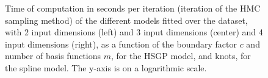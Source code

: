 \documentclass[onecolumn,a4paper,11pt]{article}
\begin{document}
\begin{figure}
\caption{Time of computation in seconds per iteration (iteration of the HMC sampling method) of the different models fitted over the dataset, with 2 input dimensions (left) and 3 input dimensions (center) and 4 input dimensions (right), as a function of the boundary factor $c$ and number of basis functions $m$, for the HSGP model, and knots, for the spline model. The y-axis is on a logarithmic scale.}
  \label{ch5_fig20_time2D_diabetes}
\end{figure}
\end{document}
